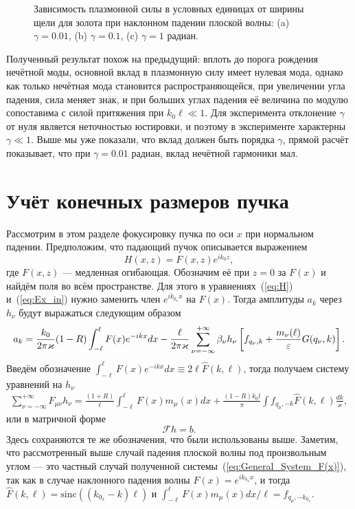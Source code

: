 \begin{figure}
\begin{subfigure}[t]{0.6\textwidth}
        \caption{}  
    \end{subfigure}
    \caption{Зависимость плазмонной силы в условных единицах от ширины щели для золота при наклонном падении плоской волны: (a) $\gamma = 0.01$, (b) $\gamma = 0.1$, (c)  $\gamma = 1$ радиан.}
    \label{fig:Force100_angle}
\end{figure}

Полученный результат похож на предыдущий: вплоть до порога рождения нечётной моды, основной вклад в плазмонную силу имеет нулевая мода, однако как только нечётная мода становится распространяющейся, при увеличении угла падения, сила меняет знак, и при больших углах падения её величина по модулю сопоставима с силой притяжения при $k_0 \ell \ll 1$. Для эксперимента отклонение $\gamma$ от нуля является неточностью юстировки, и поэтому в эксперименте характерны $\gamma \ll 1$. Выше мы уже показали, что вклад должен быть порядка $\gamma$, прямой расчёт показывает, что при $\gamma = 0.01$ радиан, вклад нечётной гармоники мал.

\section{Учёт конечных размеров пучка}

Рассмотрим в этом разделе фокусировку пучка по оси $x$ при нормальном падении. Предположим, что падающий пучок описывается выражением
\begin{equation}
    H(x,z) = F(x,z)e^{i k_0 z},
\end{equation}
где $F(x,z)$ --- медленная огибающая. Обозначим её при $z = 0$ за $F(x)$ и найдём поля во всём пространстве. Для этого в уравнениях~(\ref{eq:H}) и~(\ref{eq:Ex_in}) нужно заменить член $e^{i k_{0_{x}}x}$ на $F(x)$. Тогда амплитуды $a_k$ через $h_\nu$ будут выражаться следующим образом
\begin{equation}
    a_k = \frac{k_0}{ 2\pi \varkappa} (1-R)\int_{-\ell}^\ell F(x) e^{-ikx}dx - \frac{\ell}{2 \pi \varkappa}\sum_{\nu = -\infty}^{+\infty} \beta_\nu h_\nu\left[f_{q_\nu,k}
+ \frac{m_\nu(\ell)}{\varepsilon}G(q_\nu,k)\right].
\label{eq:ak_F(x)}
\end{equation}
Введём обозначение $\int_{-\ell}^\ell F(x) e^{-ikx}dx \equiv 2\ell \hat{F}(k,\ell)$, тогда получаем систему уравнений на $h_\nu$ 
\begin{align}
	\sum_{\nu=-\infty}^{+\infty} F_{\mu \nu} h_\nu = \frac{(1+R)}{\ell}\int_{-\ell}^\ell F(x) m_\mu(x)dx + \frac{(1-R)k_{0} l}{\pi}\int f_{q_\mu,-k}\hat{F}(k,\ell) \frac{dk}{\varkappa}, \label{eq:General_System_F(x)}
\end{align}
или в матричной форме
\begin{equation}
    \mathcal{F} h = b.
    \label{eq:matrix_form_F(x)}
\end{equation}
Здесь сохраняются те же обозначения, что были использованы выше. Заметим, что рассмотренный выше случай падения плоской волны под произвольным углом --- это частный случай полученной системы~(\ref{eq:General_System_F(x)}), так как в случае наклонного падения волны $F(x) = e^{i k_{0_x}x}$, и тогда $\hat{F}(k,\ell) = \text{sinc}((k_{0_x} - k)\ell)$ и $\int_{-\ell}^\ell F(x) m_\mu(x)dx/\ell = f_{q_\mu,-k_{0_x}}$.

